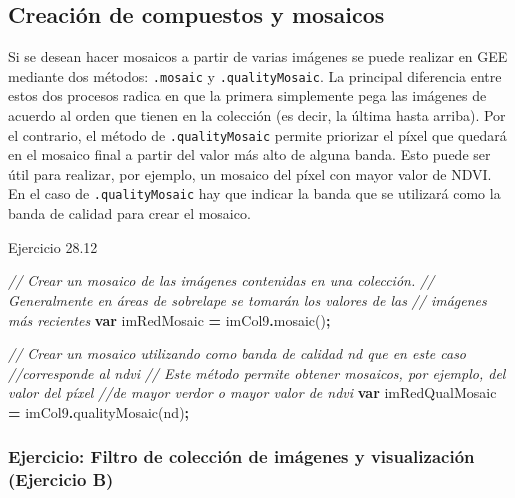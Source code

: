 \documentclass[
  12pt,
  letterpaper,
  twoside]{book}
\newenvironment{Shaded}{\begin{snugshade}}{\end{snugshade}}
\newcommand{\CommentTok}[1]{\textcolor[rgb]{0.56,0.35,0.01}{\textit{#1}}}
\newcommand{\FunctionTok}[1]{\textcolor[rgb]{0.00,0.00,0.00}{#1}}
\newcommand{\KeywordTok}[1]{\textcolor[rgb]{0.13,0.29,0.53}{\textbf{#1}}}
\newcommand{\NormalTok}[1]{#1}
\newcommand{\OperatorTok}[1]{\textcolor[rgb]{0.81,0.36,0.00}{\textbf{#1}}}
\newcommand{\StringTok}[1]{\textcolor[rgb]{0.31,0.60,0.02}{#1}}
\begin{document}
\hypertarget{creaciuxf3n-de-compuestos-y-mosaicos}{%
\subsection{Creación de compuestos y mosaicos}\label{creaciuxf3n-de-compuestos-y-mosaicos}}

Si se desean hacer mosaicos a partir de varias imágenes se puede realizar en GEE mediante dos métodos: \texttt{.mosaic} y \texttt{.qualityMosaic}. La principal diferencia entre estos dos procesos radica en que la primera simplemente pega las imágenes de acuerdo al orden que tienen en la colección (es decir, la última hasta arriba). Por el contrario, el método de \texttt{.qualityMosaic} permite priorizar el píxel que quedará en el mosaico final a partir del valor más alto de alguna banda. Esto puede ser útil para realizar, por ejemplo, un mosaico del píxel con mayor valor de NDVI. En el caso de \texttt{.qualityMosaic} hay que indicar la banda que se utilizará como la banda de calidad para crear el mosaico.

Ejercicio 28.12

\begin{Shaded}
\begin{Highlighting}[]
\CommentTok{// Crear un mosaico de las imágenes contenidas en una colección. }
\CommentTok{// Generalmente en áreas de sobrelape se tomarán los valores de las }
\CommentTok{// imágenes más recientes}
\KeywordTok{var}\NormalTok{ imRedMosaic }\OperatorTok{=}\NormalTok{ imCol9}\OperatorTok{.}\FunctionTok{mosaic}\NormalTok{()}\OperatorTok{;}

\CommentTok{// Crear un mosaico utilizando como banda de calidad \textquotesingle{}nd\textquotesingle{} que en este caso}
\CommentTok{//corresponde al ndvi}
\CommentTok{// Este método permite obtener mosaicos, por ejemplo, del valor del píxel}
\CommentTok{//de mayor verdor o mayor valor de ndvi}
\KeywordTok{var}\NormalTok{ imRedQualMosaic }\OperatorTok{=}\NormalTok{ imCol9}\OperatorTok{.}\FunctionTok{qualityMosaic}\NormalTok{(}\StringTok{\textquotesingle{}nd\textquotesingle{}}\NormalTok{)}\OperatorTok{;}
\end{Highlighting}
\end{Shaded}

\hypertarget{ejercicio-filtro-de-colecciuxf3n-de-imuxe1genes-y-visualizaciuxf3n-ejercicio-b}{%
\subsubsection{Ejercicio: Filtro de colección de imágenes y visualización (Ejercicio B)}\label{ejercicio-filtro-de-colecciuxf3n-de-imuxe1genes-y-visualizaciuxf3n-ejercicio-b}}
\end{document}
